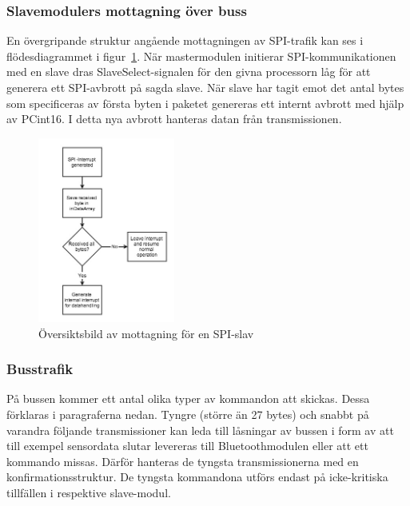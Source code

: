 \documentclass[a4paper,12pt,fleqn]{article}
\begin{document}
\subsubsection{Slavemodulers mottagning över buss}
En övergripande struktur angående mottagningen av SPI-trafik kan ses i flödesdiagrammet i figur~\ref{fig:spislave}. När mastermodulen initierar SPI-kommunikationen med en slave dras SlaveSelect-signalen för den givna processorn låg för att generera ett SPI-avbrott på sagda slave. När slave har tagit emot det antal bytes som specificeras av första byten i paketet genereras ett internt avbrott med hjälp av PCint16. I detta nya avbrott hanteras datan från transmissionen.

\begin{figure}[htp] %
  \begin{center}
  \includegraphics[keepaspectratio=true,width=0.4\textwidth]{bilder/spislaverec.jpg}  %
  \end{center}
  \caption{Översiktsbild av mottagning för en SPI-slav} %
  \label{fig:spislave}
\end{figure}

\newpage

\subsubsection{Busstrafik}
På bussen kommer ett antal olika typer av kommandon att skickas. Dessa förklaras i paragraferna nedan. 
Tyngre (större än 27 bytes) och snabbt på varandra följande transmissioner kan leda till låsningar av bussen i form av att till exempel sensordata slutar levereras till Bluetoothmodulen eller att ett kommando missas. Därför hanteras de tyngsta transmissionerna med en konfirmationsstruktur.
De tyngsta kommandona utförs endast på icke-kritiska tillfällen i respektive slave-modul.
\end{document}
